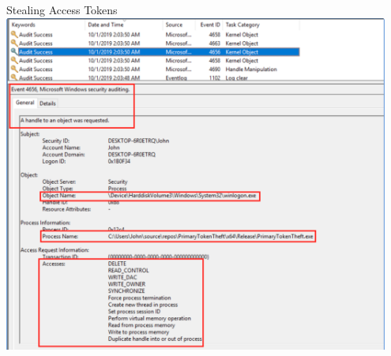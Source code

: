 \documentclass[nobackground,dvipsnames,table,aspectratio=169]{beamer}
\begin{document}
\begin{frame}{Stealing Access Tokens}
    \includegraphics[width=0.95\textwidth]{stealing-access-tokens}
\end{frame}
\end{document}
